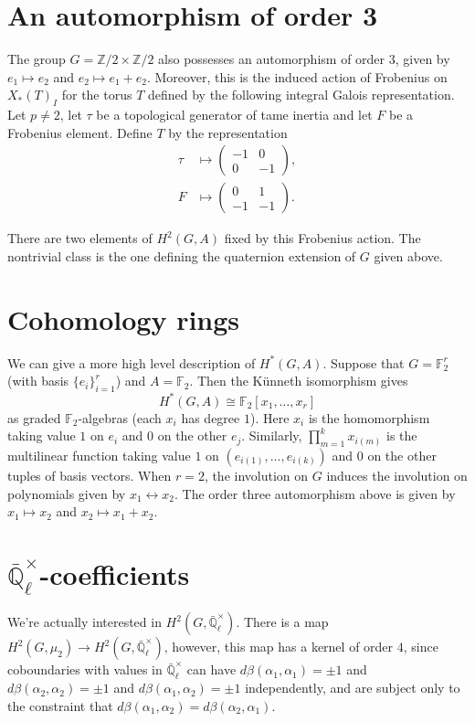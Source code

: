 \documentclass{article}
\newcommand{\ZZ}{\mathbb{Z}}
\newcommand{\Zt}{\ZZ/2}
\newcommand{\Ft}{\mathbb{F}_2}
\newcommand{\Ex}{\bar{\mathbb{Q}}_\ell^\times}
\theoremstyle{plain}
\begin{document}
\section*{An automorphism of order 3}

The group $G = \Zt \times \Zt$ also possesses an automorphism of order $3$, given by $e_1 \mapsto e_2$ and $e_2 \mapsto e_1 + e_2$.  Moreover, this is the induced action of Frobenius on $X_*(T)_I$ for the torus $T$ defined by the following integral Galois representation.  Let $p \ne 2$, let $\tau$ be a topological generator of tame inertia and let $F$ be a Frobenius element.  Define $T$ by the representation
\begin{align*}
\tau &\mapsto \begin{pmatrix} -1 & 0 \\ 0 & -1 \end{pmatrix}, \\
F &\mapsto \begin{pmatrix} 0 & 1 \\ -1 & -1 \end{pmatrix}.
\end{align*}

There are two elements of $H^2(G, A)$ fixed by this Frobenius action.  The nontrivial class is the one defining the quaternion extension of $G$ given above.

\section*{Cohomology rings}

We can give a more high level description of $H^*(G, A)$.  Suppose that $G = \Ft^r$ (with basis $\{e_i\}_{i=1}^r$) and $A = \Ft$.  Then the K\"unneth isomorphism gives
\[
H^*(G, A) \cong \Ft[x_1, \dots, x_r]
\]
as graded $\Ft$-algebras (each $x_i$ has degree $1$).  Here $x_i$ is the homomorphism taking value $1$ on $e_i$ and $0$ on the other $e_j$.  Similarly, $\prod_{m = 1}^k x_{i(m)}$ is the multilinear function taking value $1$ on $(e_{i(1)}, \dots, e_{i(k)})$ and $0$ on the other tuples of basis vectors.  When $r = 2$, the involution on $G$ induces the involution on polynomials given by $x_1 \leftrightarrow x_2$.  The order three automorphism above is given by $x_1 \mapsto x_2$ and $x_2 \mapsto x_1 + x_2$.

\section*{$\Ex$-coefficients}

We're actually interested in $H^2(G, \Ex)$.  There is a map $H^2(G, \mu_2) \to H^2(G, \Ex)$, however, this map has a kernel of order $4$, since coboundaries with values in $\Ex$ can have $d\beta(\alpha_1, \alpha_1) = \pm 1$ and $d\beta(\alpha_2, \alpha_2) = \pm 1$ and $d\beta(\alpha_1, \alpha_2) = \pm 1$ independently, and are subject only to the constraint that $d\beta(\alpha_1, \alpha_2) = d\beta(\alpha_2, \alpha_1)$.
\end{document}
